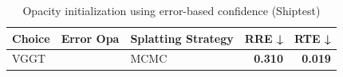\begin{table}[H]
\caption{Opacity initialization using error-based confidence (Shiptest)}
\label{tab:05_error_opa_shiptest}
\begin{tabular}{lllrr}
\toprule
Choice & Error Opa & Splatting Strategy & RRE ↓ & RTE ↓ \\
\midrule
VGGT &  & MCMC & \textbf{0.310} & \textbf{0.019} \\
\bottomrule
\end{tabular}
\end{table}
